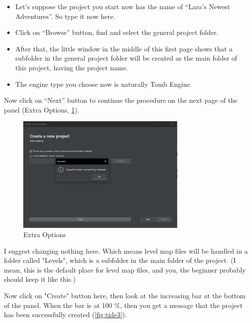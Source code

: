 \begin{itemize}
    \item Let's suppose the project you start now has the name of “Lara's Newest Adventures”. So type it now here.
    \item Click on “Browse” button, find and select the general project folder.
    \item After that, the little window in the middle of this first page shows that a subfolder in the general project folder will be created as the main folder of this project, having the project name.
    \item The engine type you choose now is naturally Tomb Engine.
\end{itemize}


\par Now click on “Next” button to continue the procedure on the next page of the panel (Extra Options, \ref{fig:tide2}).

\begin{figure}
    \centering
     \includegraphics[width=0.75\textwidth]{screenshots/2.jpg}
     \caption{Extra Options}
     \label{fig:tide2}
\end{figure}

\par I suggest changing nothing here. Which means level map files will be handled in a folder called "Levels", which is a subfolder in the main folder of the project. (I mean, this is the default place for level map files, and you, the beginner probably should keep it like this.)
\par Now click on "Create" button here, then look at the increasing bar at the bottom of the panel.
When the bar is at 100 \%, then you get a message that the project has been successfully created (\ref{fig:tide3}).

